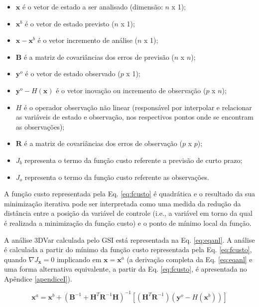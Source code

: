 \begin{itemize}
	\item $\mathbf{x}$ é o vetor de estado a ser analisado (dimensão: $n$ x 1);
	\item $\mathbf{x}^{b}$ é o vetor de estado previsto ($n$ x 1);
	\item $\mathbf{x}-\mathbf{x}^{b}$ é o vetor incremento de análise ($n$ x 1);
	\item $\mathbf{B}$ é a matriz de covariâncias dos erros de previsão ($n$ x $n$);
	\item $\mathbf{y}^{o}$ é o vetor de estado observado ($p$ x 1);
	\item $\mathbf{y}^{o}-H(\mathbf{x})$ é o vetor inovação ou incremento de observação ($p$ x $n$);
	\item $H$ é o operador observação não linear (responsável por interpolar e relacionar as variáveis de estado e observação, nos respectivos pontos onde se encontram as observações);
	\item $\mathbf{R}$ é a matriz de covariâncias dos erros de observação ($p$ x $p$);
	\item $J_{b}$ representa o termo da função custo referente a previsão de curto prazo;
	\item $J_{o}$ representa o termo da função custo referente as observações.
\end{itemize}

A função custo representada pela Eq. \ref{eq:fcusto} é quadrática e o resultado da sua minimização iterativa pode ser interpretada como uma medida da redução da distância entre a posição da variável de controle (i.e., a variável em torno da qual é realizada a minimização da função custo) e o ponto de mínimo local da função. 

A análise 3DVar calculada pelo GSI está representada na Eq. \ref{eq:eqanl}. A análise é calculada a partir do mínimo da função custo representada pela Eq. \ref{eq:fcusto}, quando $\nabla{J}_{\mathbf{x}}=0$ implicando em $\mathbf{x}=\mathbf{x}^{a}$ (a derivação completa da Eq. \ref{eq:eqanl} e uma forma alternativa equivalente, a partir da Eq. \ref{eq:fcusto}, é apresentada no Apêndice \ref{apendiceI}). 

\begin{equation}
    \label{eq:eqanl}
    \mathbf{x}^{a} = \mathbf{x}^{b} + (\mathbf{B}^{-1} + \mathbf{H}^{T}\mathbf{R}^{-1}\mathbf{H})^{-1}[(\mathbf{H}^{T}\mathbf{R}^{-1})(\mathbf{y}^{o} - H(\mathbf{x}^{b}))]
\end{equation}


